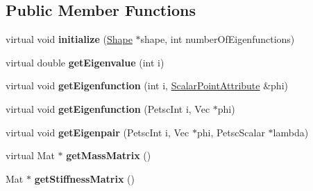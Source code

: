 \subsection*{Public Member Functions}
\begin{DoxyCompactItemize}
\item 
\hypertarget{class_f_e_m_laplace_beltrami_operator_a42bd51150afce240e48dbac75a6bc96b}{}virtual void {\bfseries initialize} (\hyperlink{class_shape}{Shape} $\ast$shape, int number\+Of\+Eigenfunctions)\label{class_f_e_m_laplace_beltrami_operator_a42bd51150afce240e48dbac75a6bc96b}

\item 
\hypertarget{class_f_e_m_laplace_beltrami_operator_a9e2d42cf84a9f24e2834621cd9b488df}{}virtual double {\bfseries get\+Eigenvalue} (int i)\label{class_f_e_m_laplace_beltrami_operator_a9e2d42cf84a9f24e2834621cd9b488df}

\item 
\hypertarget{class_f_e_m_laplace_beltrami_operator_af11d2968c30838048eaeea7fb2fc6395}{}virtual void {\bfseries get\+Eigenfunction} (int i, \hyperlink{class_scalar_point_attribute}{Scalar\+Point\+Attribute} \&phi)\label{class_f_e_m_laplace_beltrami_operator_af11d2968c30838048eaeea7fb2fc6395}

\item 
\hypertarget{class_f_e_m_laplace_beltrami_operator_a058af519fb64e4e7c6ea44c1383a864f}{}virtual void {\bfseries get\+Eigenfunction} (Petsc\+Int i, Vec $\ast$phi)\label{class_f_e_m_laplace_beltrami_operator_a058af519fb64e4e7c6ea44c1383a864f}

\item 
\hypertarget{class_f_e_m_laplace_beltrami_operator_a1b9cd4fca7b25131426d432030b53747}{}virtual void {\bfseries get\+Eigenpair} (Petsc\+Int i, Vec $\ast$phi, Petsc\+Scalar $\ast$lambda)\label{class_f_e_m_laplace_beltrami_operator_a1b9cd4fca7b25131426d432030b53747}

\item 
\hypertarget{class_f_e_m_laplace_beltrami_operator_a3d1bc2fb74325cb75bdcbcce57c24700}{}virtual Mat $\ast$ {\bfseries get\+Mass\+Matrix} ()\label{class_f_e_m_laplace_beltrami_operator_a3d1bc2fb74325cb75bdcbcce57c24700}

\item 
\hypertarget{class_f_e_m_laplace_beltrami_operator_a93a2063dfb32f86eb0973743631bccb1}{}Mat $\ast$ {\bfseries get\+Stiffness\+Matrix} ()\label{class_f_e_m_laplace_beltrami_operator_a93a2063dfb32f86eb0973743631bccb1}

\end{DoxyCompactItemize}
